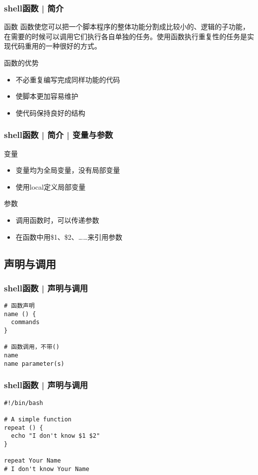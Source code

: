 \begin{frame}
  \frametitle{shell函数 | 简介}
  \begin{block}{函数}
    函数使您可以把一个脚本程序的整体功能分割成比较小的、逻辑的子功能，在需要的时候可以调用它们执行各自单独的任务。使用函数执行重复性的任务是实现代码重用的一种很好的方式。
  \end{block}
  \pause
  \begin{block}{函数的优势}
    \begin{itemize}
      \item 不必重复编写完成同样功能的代码
      \item 使脚本更加容易维护
      \item 使代码保持良好的结构
    \end{itemize}
  \end{block}
\end{frame}

\begin{frame}
  \frametitle{shell函数 | 简介 | \alert{变量与参数}}
  \begin{block}{变量}
    \begin{itemize}
      \item 变量均为全局变量，没有局部变量
      \item 使用local定义局部变量
    \end{itemize}
  \end{block}
  \pause
  \begin{block}{参数}
    \begin{itemize}
      \item 调用函数时，可以传递参数
      \item 在函数中用\$1、\$2、……来引用参数
    \end{itemize}
  \end{block}
\end{frame}

\subsection{声明与调用}
\begin{frame}[fragile]
  \frametitle{shell函数 | \alert{声明与调用}}
\begin{lstlisting}
# 函数声明
name () {
  commands
}

# 函数调用，不带()
name
name parameter(s)
\end{lstlisting}
\end{frame}

\begin{frame}[fragile]
  \frametitle{shell函数 | 声明与调用}
\begin{lstlisting}
#!/bin/bash

# A simple function
repeat () {
  echo "I don't know $1 $2"
}

repeat Your Name
# I don't know Your Name
\end{lstlisting}
\end{frame}

